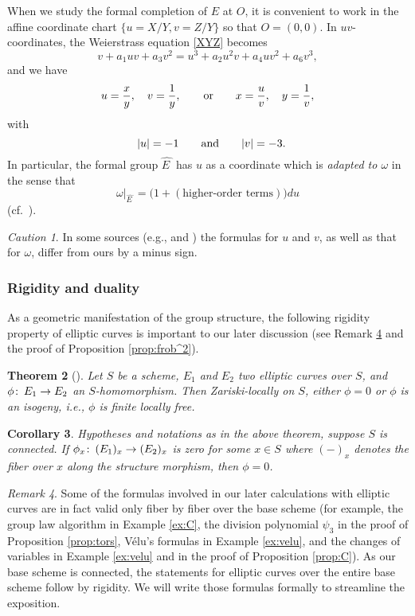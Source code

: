 \documentclass{gtpart}
\newtheorem{thm}{Theorem}
\newtheorem{cor}[thm]{Corollary}
\theoremstyle{definition}
\theoremstyle{remark}
\newtheorem{rmk}[thm]{Remark}
\newtheorem{cau}[thm]{Caution}
\def\co{\colon\thinspace}
\newcommand{\HE}{\widehat{E~}\!}
\newcommand{\ad}{{\rm and}}
\numberwithin{equation}{section}
\numberwithin{thm}{section}
\begin{document}
When we study the formal completion of $E$ at $O$, it is convenient to 
work in the affine coordinate chart $\{u = X/Y, v = Z/Y\}$ so that 
$O = (0,0)$.  In $uv$-coordinates, the Weierstrass equation \eqref{XYZ} 
becomes 
\[
 v + a_1 u v + a_3 v^2 = u^3 + a_2 u^2 v + a_4 u v^2 + a_6 v^3, 
\]
and we have 
\[
 u = \frac{x}{y}, \quad v = \frac{1}{y}, \qquad {\rm or} \qquad 
 x = \frac{u}{v}, \quad y = \frac{1}{v}, 
\]
with 
\[
 ~~ |u| = -1 \qquad \ad \qquad |v| = -3.  
\]
In particular, the formal group $\HE$ has $u$ as a coordinate which is 
{\em adapted to $\omega$} in the sense that 
\begin{equation}
\label{adapted}
 \omega|_{\HE} = \big( 1 + (\text{higher-order terms}) \big) du 
\end{equation}
(cf.~\cite[IV.1]{AEC}).  

\begin{cau}
\label{cau}
 In some sources (e.g., \cite[IV.1]{AEC} and \cite[Section 9]{pearson}) 
 the formulas for $u$ and $v$, as well as that for $\omega$, differ from 
 ours by a minus sign.  
\end{cau}

\subsubsection*{Rigidity and duality}

As a geometric manifestation of the group structure, the following 
rigidity property of elliptic curves is important to our later 
discussion (see Remark \ref{rmk:rig} and the proof of Proposition 
\ref{prop:frob^2}).  

\begin{thm}[{\cite[2.4.2]{KM}}]
 Let $S$ be a scheme, $E_1$ and $E_2$ two elliptic curves over $S$, and 
 $\phi \co E_1 \to E_2$ an $S$-homomorphism.  Then Zariski-locally on 
 $S$, either $\phi = 0$ or $\phi$ is an {\em isogeny}, i.e., $\phi$ is 
 finite locally free.  
\end{thm}

\begin{cor}
\label{cor:rig}
 Hypotheses and notations as in the above theorem, suppose $S$ is 
 connected.  If $\phi_x \co (E_1)_x \to (E_2)_x$ is zero for some 
 $x \in S$ where $(-)_x$ denotes the fiber over $x$ along the structure 
 morphism, then $\phi = 0$.  
\end{cor}

\begin{rmk}
\label{rmk:rig}
 Some of the formulas involved in our later calculations with elliptic 
 curves are in fact valid only fiber by fiber over the base scheme (for 
 example, the group law algorithm in Example \ref{ex:C}, the division 
 polynomial $\psi_3$ in the proof of Proposition \ref{prop:tors}, 
 V\'elu's formulas in Example \ref{ex:velu}, and the changes of 
 variables in Example \ref{ex:velu} and in the proof of Proposition 
 \ref{prop:C}).  As our base scheme is connected, the statements for 
 elliptic curves over the entire base scheme follow by rigidity.  We 
 will write those formulas formally to streamline the exposition.  
\end{rmk}
\end{document}
